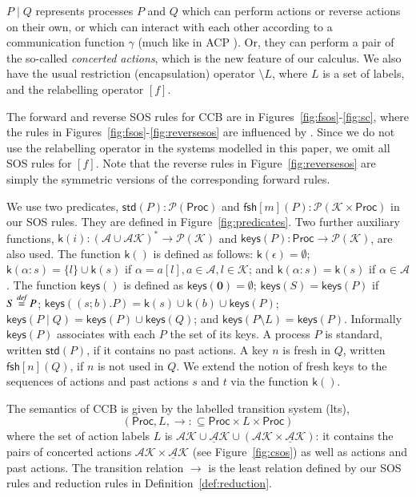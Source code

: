 \documentclass[preprint,12pt]{elsarticle}
\newcommand{\paral}{\; \vert \;}
\newcommand{\Proc}{\mathsf{Proc}}
\newcommand{\restrict}[1]{\!\setminus\!#1}
\newcommand{\mAK}{\mathcal{AK}}
\newcommand{\umAK}{\underline{\mathcal{A}}\mathcal{K}}
\newcommand{\Nil}{\mathbf{0}}
\newcommand{\std}[1]{\mathsf{std}(#1)}
\newcommand{\keys}[1]{\mathsf{keys}(#1)}
\newcommand{\kkey}[1]{\mathsf{k}(#1)}
\newcommand{\Keys}{\mathcal{K}}
\newcommand{\freshpred}[1]{\mathsf{fsh}[#1]}
\newcommand{\fresh}[2]{\mathsf{fsh}[#1](#2)}
\newcommand{\bydef}{\stackrel{\emph{def}}{=}}
\begin{document}
$P\paral Q$ represents processes $P$ and $Q$ which can perform actions or reverse actions on
their own, or which can interact with each other according to a communication function
$\gamma$ (much like in ACP \cite{BW90}). Or, they can perform a pair of the so-called \emph{concerted actions},
which is the new feature of our calculus.
We also have the usual restriction (encapsulation) operator
$\setminus L$, where $L$ is a set of labels, and the relabelling operator $[f]$.

The forward and reverse SOS rules for CCB are in 
Figures~\ref{fig:fsos}-\ref{fig:sc}, where
the rules in Figures~\ref{fig:fsos}-\ref{fig:reversesos}
are influenced by \cite{PhiUli07}. Since we do not use the relabelling operator in the systems modelled in 
this paper, we omit all SOS rules for $[f]$.
Note that the reverse rules in Figure~\ref{fig:reversesos}
are simply the symmetric versions of the corresponding forward rules. 

We use two predicates, $\std{P}:\mathcal{P}(\Proc)$ and $\fresh{m}{P}:\mathcal{P}(\Keys \times 
\Proc)$ in our SOS rules. They are defined in Figure~\ref{fig:predicates}. Two further auxiliary 
functions, 
$\kkey{i}: (\mathcal{A}\cup\mathcal{AK})^* \rightarrow \mathcal{P}(\Keys)$ and $\keys{P}: \Proc 
\rightarrow \mathcal{P}(\Keys)$, are also used. The function $\kkey{}$ is defined as follows:
$ \kkey{\epsilon}=\emptyset$;  $\kkey{\alpha:s}= \{l\}\cup\kkey{s}$ if $\alpha=a[l],a\in \mathcal{A},l \in \Keys$;
and $\kkey{\alpha:s}= \kkey{s}$ if $\alpha \in \mathcal{A}$.
The function $\keys{}$ is defined as $\keys{\Nil}=\emptyset$; $\keys{S}=\keys{P}$ if $S\bydef P$;
$\keys{(s;b).P}=\kkey{s} \cup \kkey{b} \cup \keys{P}$; 
$\keys{P \paral Q}= \keys{P} \cup \keys{Q}$; and $ \keys{P \restrict L}=\keys{P}$.
Informally $\keys{P}$ associates with each $P$ the set of its keys. A process $P$ is standard, 
written $\std{P}$, if it contains no past actions. A key $n$ is fresh in $Q$, written $\freshpred{n}(Q)$, 
if $n$ is not used in $Q$. We extend the notion of fresh keys to the sequences of actions and 
past actions $s$ and $t$ via the function $\kkey{}$.


The semantics of CCB is given by the labelled transition system (lts),
$$ (\Proc, L,\rightarrow: \subseteq \Proc \times L \times \Proc)$$
where the set of action labels $L$ is $\mAK \cup \umAK \cup (\mAK \times \umAK)$: it contains
the pairs of concerted actions $\mAK \times \umAK$ (see Figure~\ref{fig:csos}) as well as actions and past actions. 
The transition relation $\rightarrow$
is the least relation defined by our SOS rules and reduction rules in Definition~\ref{def:reduction}.
\end{document}

